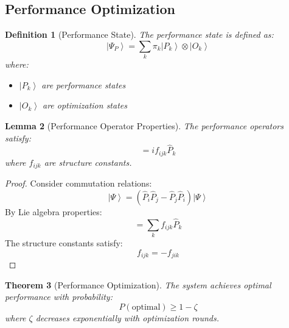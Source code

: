 \documentclass[12pt]{article}
\newcommand{\ket}[1]{\left|#1\right\rangle}
\newcommand{\op}[1]{\hat{#1}}
\newtheorem{theorem}{Theorem}[section]
\newtheorem{lemma}[theorem]{Lemma}
\newtheorem{definition}[theorem]{Definition}
\begin{document}
\subsection{Performance Optimization}
\begin{definition}[Performance State]
The performance state is defined as:
\begin{equation}
\ket{\Psi_P} = \sum_k \pi_k\ket{P_k} \otimes \ket{O_k}
\end{equation}
where:
\begin{itemize}
\item $\ket{P_k}$ are performance states
\item $\ket{O_k}$ are optimization states
\end{itemize}
\end{definition}
\begin{lemma}[Performance Operator Properties]
The performance operators satisfy:
\begin{equation}
[\op{P}_i,\op{P}_j] = if_{ijk}\op{P}_k
\end{equation}
where $f_{ijk}$ are structure constants.
\end{lemma}
\begin{proof}
Consider commutation relations:
\begin{equation}
[\op{P}_i,\op{P}_j]\ket{\Psi} = (\op{P}_i\op{P}_j - \op{P}_j\op{P}_i)\ket{\Psi}
\end{equation}
By Lie algebra properties:
\begin{equation}
[\op{P}_i,\op{P}_j] = \sum_k f_{ijk}\op{P}_k
\end{equation}
The structure constants satisfy:
\begin{equation}
f_{ijk} = -f_{jik}
\end{equation}
\end{proof}
\begin{theorem}[Performance Optimization]
The system achieves optimal performance with probability:
\begin{equation}
P(\text{optimal}) \geq 1 - \zeta
\end{equation}
where $\zeta$ decreases exponentially with optimization rounds.
\end{theorem}
\end{document}
